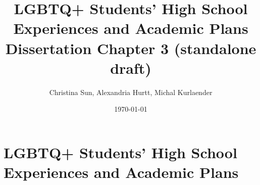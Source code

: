 \documentclass[letterpaper,11pt]{report}
\begin{document}
\title{LGBTQ+ Students' High School Experiences and Academic Plans \\
       \large{Dissertation Chapter 3 (standalone draft)}}
\author{Christina Sun, Alexandria Hurtt, Michal Kurlaender}
\date{\today}

\maketitle

\chapter{LGBTQ+ Students' High School Experiences and Academic Plans}
\label{chap:ch3}


\printbibliography
\end{document}
